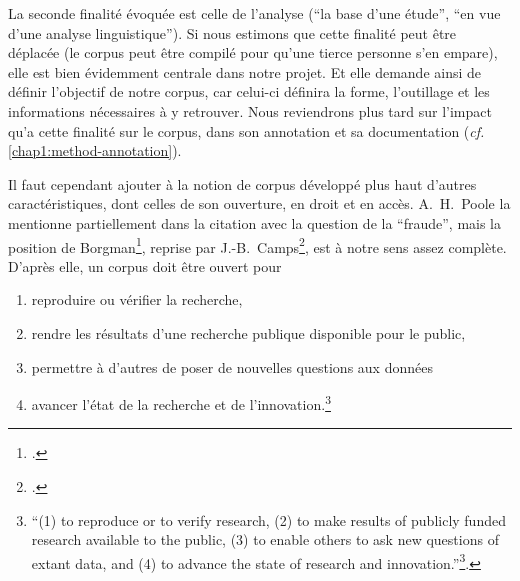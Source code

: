 La seconde finalité évoquée est celle de l'analyse (``la base d'une étude'', ``en vue d'une analyse linguistique''). Si nous estimons que cette finalité peut être déplacée (le corpus peut être compilé pour qu'une tierce personne s'en empare), elle est bien évidemment centrale dans notre projet. Et elle demande ainsi de définir l'objectif de notre corpus, car celui-ci définira la forme, l'outillage et les informations nécessaires à y retrouver. Nous reviendrons plus tard sur l'impact qu'a cette finalité sur le corpus, dans son annotation et sa documentation (\textit{cf.} \ref{chap1:method-annotation}).

Il faut cependant ajouter à la notion de corpus développé plus haut d'autres caractéristiques, dont celles de son ouverture, en droit et en accès. A.~H.~Poole la mentionne partiellement dans la citation avec la question de la ``fraude'', mais la position de Borgman\footcite{borgman2012conundrum}, reprise par J.-B.~Camps\footcite{camps_ou_2018}, est à notre sens assez complète. D'après elle, un corpus doit être ouvert pour
\begin{enumerate}
    \item reproduire ou vérifier la recherche,
    \item rendre les résultats d'une recherche publique disponible pour le public,
    \item permettre à d'autres de poser de nouvelles questions aux données
    \item avancer l'état de la recherche et de l'innovation.\footnote{``(1) to reproduce or to verify research, (2) to make results of publicly funded research available to the public, (3) to enable others to ask new questions of extant data, and (4) to advance the state of research and innovation.''\footnote{\cite{borgman2012conundrum} chez \cite{camps_ou_2018}}.}
\end{enumerate}

